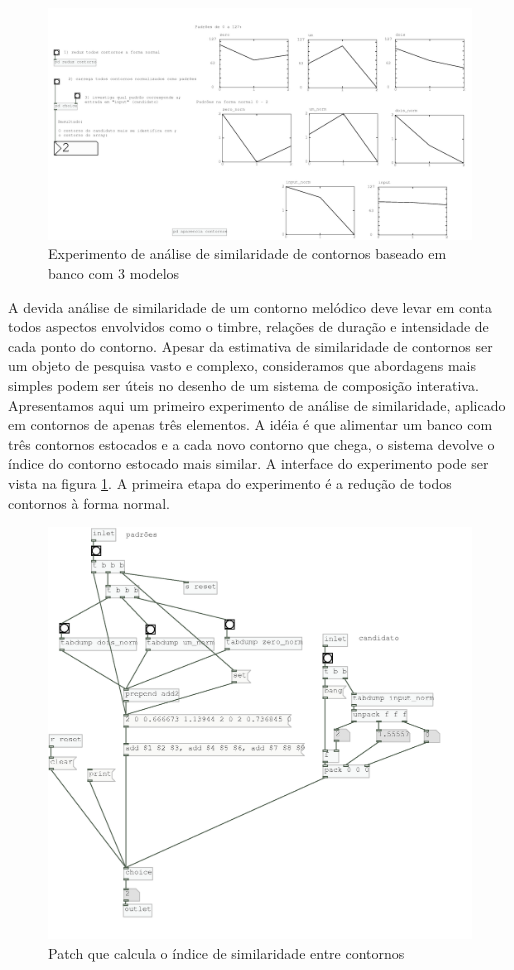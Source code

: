 \documentclass{ppgmus}
\begin{document}
\begin{figure}
\includegraphics[scale=.4]{similaridade-interface}
\caption{Experimento de análise de similaridade de contornos baseado em banco com 3 modelos}
\label{similaridade-interface}
\end{figure}

A devida análise de similaridade de um contorno melódico deve levar em conta todos
aspectos envolvidos como o timbre, relações de duração e intensidade de cada ponto do contorno.
Apesar da estimativa de similaridade de contornos ser um objeto de pesquisa vasto e complexo, 
consideramos que abordagens
mais simples podem ser úteis no desenho de um sistema de composição interativa.
Apresentamos aqui um primeiro experimento de análise de similaridade, aplicado em
contornos de apenas três elementos. A idéia é que alimentar um banco com três contornos estocados e a cada
novo contorno que chega, o sistema devolve o índice do contorno estocado mais similar.
A interface do experimento pode ser vista na figura \ref{similaridade-interface}.
A primeira etapa do experimento é a redução de todos contornos à forma normal.

\begin{figure}
\includegraphics[scale=.5]{similaridade-algo}
\caption{Patch que calcula o índice de similaridade entre contornos}
\label{similaridade-algo}
\end{figure}
\end{document}

